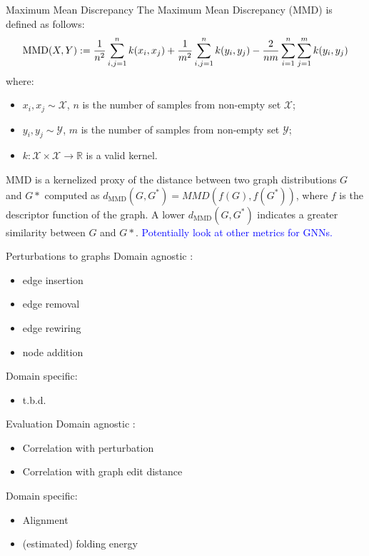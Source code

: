 \documentclass[aspectratio=169, 10pt, dvipsnames, handout]{beamer}
\begin{document}
\begin{frame}[fragile]{Maximum Mean Discrepancy}
  The Maximum Mean Discrepancy (MMD) \cite{gretton2012kernel,borgwardt2006integrating} is defined as follows:
  \begin{equation*}
    \label{eq:mmd}
    \text{MMD}(X, Y) := {1\over n^2} \sum_{i,j=1}^{n}k(x_i, x_j) + {1\over m^2} \sum_{i,j=1}^{n}k(y_i, y_j) - {2\over nm} \sum_{i=1}^{n}\sum_{j=1}^{m}k(y_i, y_j)
  \end{equation*}
  where:
  \begin{itemize}
  \item  $x_i, x_j \sim \mathcal{X}$, $n$ is the number of samples from non-empty set $\mathcal{X}$;
  \item  $y_i, y_j \sim \mathcal{Y}$, $m$ is the number of samples from non-empty set $\mathcal{Y}$;
  \item $k: \mathcal{X}\times\mathcal{X}\to\mathbb{R}$ is a valid kernel.
  \end{itemize}
  MMD is a kernelized proxy of the distance between two graph distributions $G$ and $G*$ computed as $d_{\text{MMD}}(G,G^*)=MMD(f(G),f(G^*))$, where $f$ is the descriptor function of the graph. A lower $d_{\text{MMD}}(G,G^*)$ indicates a greater similarity between $G$ and $G*$.
  \textcolor{blue}{Potentially look at other metrics for GNNs. \cite{thompson2022evaluation}}
\end{frame}

\begin{frame}[fragile]{Perturbations to graphs}
  Domain agnostic \cite{o2021evaluation}:
  \begin{itemize}
  \item edge insertion
  \item edge removal
  \item edge rewiring
  \item node addition
  \end{itemize}

  Domain specific:
  \begin{itemize}
  \item t.b.d.
  \end{itemize}
\end{frame}

\begin{frame}[fragile]{Evaluation}
  Domain agnostic \cite{o2021evaluation}:
  \begin{itemize}
  \item Correlation with perturbation
  \item Correlation with graph edit distance
  \end{itemize}

  Domain specific:
  \begin{itemize}
  \item Alignment
  \item (estimated) folding energy
  \end{itemize}
\end{frame}
\end{document}
